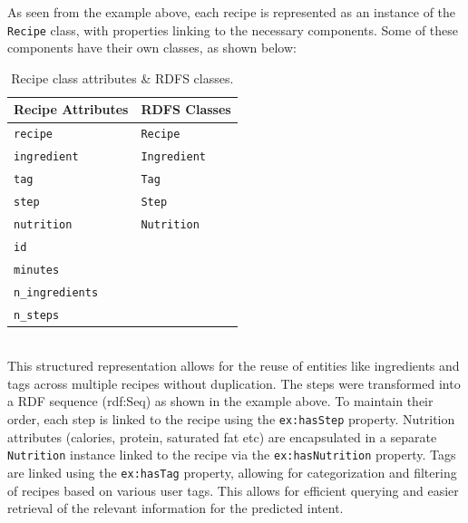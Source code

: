 \documentclass[conference]{IEEEtran}
\begin{document}
\noindent
As seen from the example above, each recipe is represented as an instance of the \texttt{Recipe} class, with properties linking to the necessary components. Some of these components have their own classes, as shown below: \\









\begin{table}[H]
\centering
\caption{Recipe class attributes \& RDFS classes.}
\label{tab:rdf-classes}
\begin{tabularx}{\columnwidth}{@{} l @{\hspace{10em}} Y @{}}
\toprule
\textbf{Recipe Attributes} & \textbf{RDFS Classes} \\
\midrule
\texttt{recipe} &  \texttt{Recipe} \\
\texttt{ingredient} & \texttt{Ingredient} \\
\texttt{tag} & \texttt{Tag} \\
\texttt{step} & \texttt{Step} \\
\texttt{nutrition} & \texttt{Nutrition} \\
\texttt{id} & \\
\texttt{minutes} & \\
\texttt{n\_ingredients} & \\
\texttt{n\_steps} & \\

\bottomrule
\end{tabularx}
\end{table}




\noindent
\\
This structured representation allows for the reuse of entities like ingredients and tags across multiple recipes without duplication. The steps were transformed into a RDF sequence (rdf:Seq) as shown in the example above. To maintain their order, each step is linked to the recipe using the \texttt{ex:hasStep} property. Nutrition attributes (calories, protein, saturated fat etc) are encapsulated in a separate \texttt{Nutrition} instance linked to the recipe via the \texttt{ex:hasNutrition} property. Tags are linked using the \texttt{ex:hasTag} property, allowing for categorization and filtering of recipes based on various user tags.
This allows for efficient querying and easier retrieval of the relevant information for the predicted intent.
\end{document}
